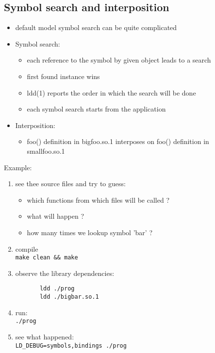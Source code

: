 \subsection{Symbol search and interposition}

\begin{itemize}
\item default model symbol search can be quite complicated
\item Symbol search:
\begin{itemize}
  \item each reference to the symbol by given object leads to a search
  \item first found instance wins
  \item ldd(1) reports the order in which the search will be done
  \item each symbol search starts from the application
\end{itemize}
\item Interposition:
\begin{itemize}
  \item foo() definition in bigfoo.so.1 interposes on foo() definition 
    in smallfoo.so.1
\end{itemize}
\end{itemize}

Example: 
\begin{enumerate}
    \item see thee source files and try to guess:
       \begin{itemize}
       \item which functions from which files will be called ?
       \item what will happen ?
       \item how many times we lookup symbol 'bar' ?
       \end{itemize}
    \item compile \\
       \texttt{make clean \&\& make}
    \item observe the library dependencies:
\begin{verbatim}
       ldd ./prog
       ldd ./bigbar.so.1
\end{verbatim}
    \item run: \\
       \texttt{./prog}
    \item see what happened: \\
       \texttt{LD\_DEBUG=symbols,bindings ./prog}
\end{enumerate}

